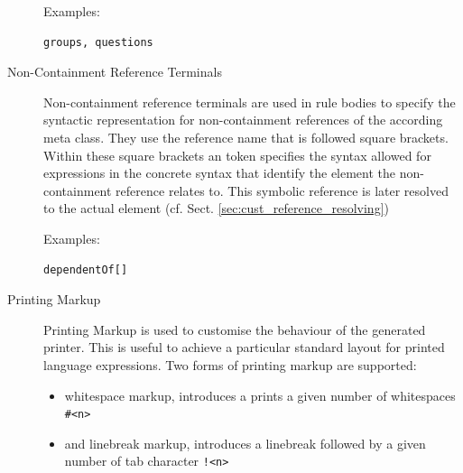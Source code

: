 \begin{description}
       Examples: \begin{verbatim}groups, questions\end{verbatim}

       \item[Non-Containment Reference Terminals] Non-containment reference
       terminals are used in rule bodies to specify the syntactic
       representation for non-containment references of the according meta
       class. They use the reference name that is followed square brackets.
       Within these square brackets an token specifies the syntax allowed for
       expressions in the concrete syntax that identify the element the
       non-containment reference relates to. This symbolic reference is later
       resolved to the actual element (cf. Sect. \ref{sec:cust_reference_resolving})

       Examples: \begin{verbatim}dependentOf[]\end{verbatim}
       
       \item[Printing Markup] Printing Markup is used to customise the behaviour
       of the generated printer. This is useful to achieve a particular standard
       layout for printed language expressions. Two forms of printing markup are
       supported: 
       \begin{itemize}
         \item whitespace markup, introduces a prints a given number of
         whitespaces \texttt{\#<n>}
         \item  and linebreak markup, introduces a linebreak followed by a given 
         number of tab character \texttt{!<n>}
       \end{itemize}
    \end{description}

